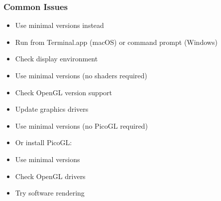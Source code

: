 \documentclass[a4paper,10pt,english,openany,oneside]{sphinxmanual}
\begin{document}
\subsubsection{Common Issues}
\label{\detokenize{legacy_examples:common-issues}}\begin{description}
\begin{itemize}
\item {} 
\sphinxAtStartPar
Use minimal versions instead

\item {} 
\sphinxAtStartPar
Run from Terminal.app (macOS) or command prompt (Windows)

\item {} 
\sphinxAtStartPar
Check display environment

\end{itemize}

\begin{itemize}
\item {} 
\sphinxAtStartPar
Use minimal versions (no shaders required)

\item {} 
\sphinxAtStartPar
Check OpenGL version support

\item {} 
\sphinxAtStartPar
Update graphics drivers

\end{itemize}

\begin{itemize}
\item {} 
\sphinxAtStartPar
Use minimal versions (no PicoGL required)

\item {} 
\sphinxAtStartPar
Or install PicoGL: 

\end{itemize}

\begin{itemize}
\item {} 
\sphinxAtStartPar
Use minimal versions

\item {} 
\sphinxAtStartPar
Check OpenGL drivers

\item {} 
\sphinxAtStartPar
Try software rendering


\end{itemize}
\end{description}
\end{document}
